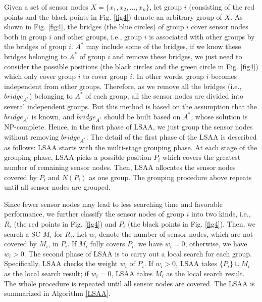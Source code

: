 \documentclass[journal]{IEEEtran}
\begin{document}
Given a set of sensor nodes $X=\{x_1,x_2,...,x_n\}$, let group $i$ (consisting of the red points and the black points in Fig. \ref{fig4}) denote an arbitrary group of $X$. As shown in Fig. \ref{fig4}, the bridges (the blue circles) of group $i$ cover sensor nodes both in group $i$ and other groups, i.e., group $i$ is associated with other groups by the bridges of group $i$. $A^*$ may include some of the bridges, if we know these bridges belonging to $A^*$ of group $i$ and remove these bridges, we just need to consider the possible positions (the black circles and the green circle in Fig. \ref{fig4}) which only cover group $i$ to cover group $i$. In other words, group $i$ becomes independent from other groups. Therefore, as we remove all the bridges (i.e., $bridge_{A^*}$) belonging to $A^*$ of each group, all the sensor nodes are divided into several independent groups. But this method is based on the assumption that the $bridge_{A^*}$ is known, and $bridge_{A^*}$ should be built based on $A^*$, whose solution is NP-complete. Hence, in the first phase of LSAA, we just group the sensor nodes without removing $bridge_{A^*}$.
The detail of the first phase of the LSAA is described as follows: LSAA starts with the multi-stage grouping phase. At each stage of the grouping phase, LSAA picks a possible position $P_i$
which covers the greatest number of remaining sensor nodes. Then, LSAA allocates the sensor nodes covered by $P_i$ and $N(P_i)$ as one group. The
grouping procedure above repeats until all sensor nodes are grouped.

Since fewer sensor nodes may lead to less searching time and favorable performance, we further classify the sensor nodes of group $i$ into two kinds, i.e.,
$R_i$ (the red points in Fig. \ref{fig4}) and $P_i$ (the black points in Fig. \ref{fig4}). Then, we search a SC $M_i$ for $R_i$. Let $w_i$ denote the number of sensor nodes, which are not covered by $M_i$, in $P_i$.
If $M_i$ fully covers $P_i$, we have $w_i=0$, otherwise, we have $w_i>0$. The second phase of LSAA is to carry out
a local search for each group. Specifically, LSAA checks the weight $w_i$ of $P_i$. If $w_i>0$, LSAA takes $\{P_i\}\cup M_i$ as the local search
result; if $w_i=0$, LSAA takes $M_i$ as the local search result. The whole procedure is repeated until all sensor nodes are covered. The LSAA is summarized in Algorithm \ref{LSAA}.
\end{document}
